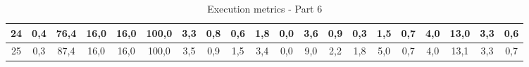 \begin{sidewaystable}[]
\begin{tabular}{|c|c|c|c|c|c|c|c|c|c|c|c|c|c|c|c|c|c|c|c|}
    24 & 0,4                                              & 76,4                                            & 16,0                                            & 16,0                                            & 100,0                                           & 3,3                                             & 0,8                                             & 0,6                                             & 1,8                                             & 0,0                                             & 3,6                                              & 0,9                                              & 0,3                                              & 1,5                                              & 0,7                                              & 4,0                                              & 13,0                                             & 3,3                                              & 0,6                                              \\ \hline
    25 & 0,3                                              & 87,4                                            & 16,0                                            & 16,0                                            & 100,0                                           & 3,5                                             & 0,9                                             & 1,5                                             & 3,4                                             & 0,0                                             & 9,0                                              & 2,2                                              & 1,8                                              & 5,0                                              & 0,7                                              & 4,0                                              & 13,1                                             & 3,3                                              & 0,7                                              \\ \hline
    \end{tabular}
    \caption{Execution metrics - Part 6}
    \label{tab:ap:exec_metrics_6}
\end{sidewaystable}

